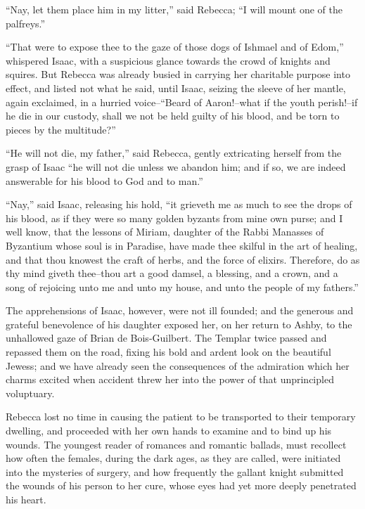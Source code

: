 ``Nay, let them place him in my litter,'' said Rebecca; ``I will mount
one of the palfreys.''

``That were to expose thee to the gaze of those dogs of Ishmael and of
Edom,'' whispered Isaac, with a suspicious glance towards the crowd of
knights and squires. But Rebecca was already busied in carrying her
charitable purpose into effect, and listed not what he said, until
Isaac, seizing the sleeve of her mantle, again exclaimed, in a hurried
voice--``Beard of Aaron!--what if the youth perish!--if he die in our
custody, shall we not be held guilty of his blood, and be torn to pieces
by the multitude?''

``He will not die, my father,'' said Rebecca, gently extricating herself
from the grasp of Isaac ``he will not die unless we abandon him; and if
so, we are indeed answerable for his blood to God and to man.''

``Nay,'' said Isaac, releasing his hold, ``it grieveth me as much to see
the drops of his blood, as if they were so many golden byzants from mine
own purse; and I well know, that the lessons of Miriam, daughter of the
Rabbi Manasses of Byzantium whose soul is in Paradise, have made thee
skilful in the art of healing, and that thou knowest the craft of herbs,
and the force of elixirs. Therefore, do as thy mind giveth thee--thou
art a good damsel, a blessing, and a crown, and a song of rejoicing unto
me and unto my house, and unto the people of my fathers.''

The apprehensions of Isaac, however, were not ill founded; and the
generous and grateful benevolence of his daughter exposed her, on her
return to Ashby, to the unhallowed gaze of Brian de Bois-Guilbert. The
Templar twice passed and repassed them on the road, fixing his bold and
ardent look on the beautiful Jewess; and we have already seen the
consequences of the admiration which her charms excited when accident
threw her into the power of that unprincipled voluptuary.

Rebecca lost no time in causing the patient to be transported to their
temporary dwelling, and proceeded with her own hands to examine and to
bind up his wounds. The youngest reader of romances and romantic
ballads, must recollect how often the females, during the dark ages, as
they are called, were initiated into the mysteries of surgery, and how
frequently the gallant knight submitted the wounds of his person to her
cure, whose eyes had yet more deeply penetrated his heart.

